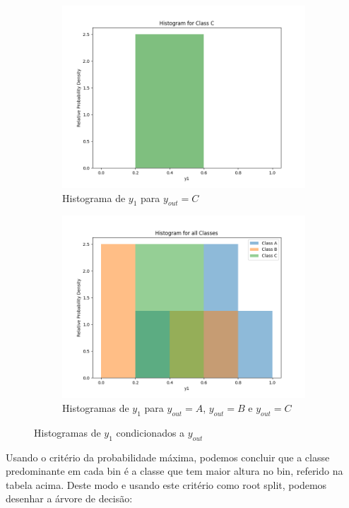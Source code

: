 \documentclass{article}
\begin{document}
\begin{figure}[H]
\begin{subfigure}{0.45\textwidth}
    \includegraphics[width=\linewidth]{images/histogram_C.png}
    \caption{Histograma de $y_1$ para $y_{out} = C$}
    \label{fig:histogram_C}
  \end{subfigure}
  \hfill
  \begin{subfigure}{0.45\textwidth}
    \includegraphics[width=\linewidth]{images/histogram_all.png}
    \caption{Histogramas de $y_1$ para $y_{out} = A$, $y_{out} = B$ e $y_{out} = C$}
    \label{fig:histogram_all}
  \end{subfigure}
  \caption{Histogramas de $y_1$ condicionados a $y_{out}$}
  \label{fig:histograms}
\end{figure}

Usando o critério da probabilidade máxima, podemos concluir que a classe predominante em cada bin é a classe que tem maior altura no bin, referido na tabela acima.
Deste modo e usando este critério como root split, podemos desenhar a árvore de decisão:
\end{document}
